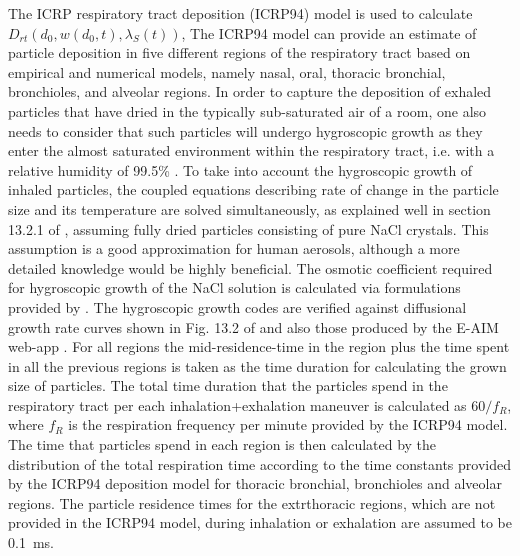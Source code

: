 \documentclass[preprint]{elsarticle}
\begin{document}
The ICRP respiratory tract deposition (ICRP94) model \cite{ICRP1994} is used to calculate $D_{rt}(d_0, w(d_0, t), \lambda_{S}(t))$,
The ICRP94 model can provide an estimate of particle deposition in five different regions of the respiratory tract based on empirical and numerical models, namely nasal, oral, thoracic bronchial, bronchioles, and alveolar regions.
In order to capture the deposition of exhaled particles that have dried in the typically sub-saturated air of a room, one also needs to consider that such particles will undergo hygroscopic growth as they enter the almost saturated environment  within the respiratory tract, i.e. with a relative humidity of 99.5\% \cite{Ferron1990, ICRP1994, Broday2001, Pohlker2021}. To take into account the hygroscopic growth of inhaled particles, the coupled equations describing rate of change in the particle size and its temperature are solved simultaneously,  as explained well in section 13.2.1 of \cite{pruppacher2010microstructure}, assuming fully dried particles consisting of  pure NaCl crystals. This assumption is a good approximation for human aerosols, although a more detailed knowledge would be highly beneficial. The osmotic coefficient required for hygroscopic growth of the NaCl solution is calculated via formulations provided by \cite{TANG1986409}. The hygroscopic growth codes are verified against diffusional growth rate curves shown in Fig. 13.2 of \cite{pruppacher2010microstructure} and also those produced by the E-AIM web-app \cite{wexler2002atmospheric}. For all regions the mid-residence-time in the region plus the time spent in all the previous regions is taken as the time duration for calculating the grown size of particles. The total time duration that the particles spend in the respiratory tract per each inhalation+exhalation maneuver is calculated as $60/f_R$, where $f_R$ is the respiration frequency per minute provided by the ICRP94 model. The time that particles spend in each region is then calculated by the distribution of the total respiration time according to the time constants provided by the ICRP94 deposition model for thoracic bronchial, bronchioles and alveolar regions. The particle residence times for the extrthoracic regions, which are not provided in the ICRP94 model, during inhalation or exhalation are assumed to be \SI{0.1}{\milli\second}.
\end{document}
